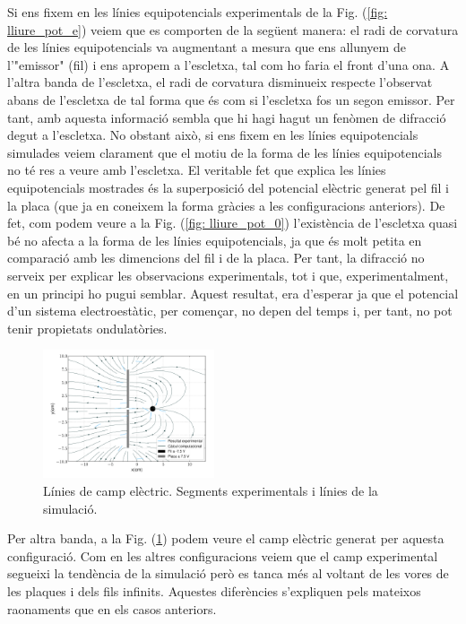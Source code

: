 \documentclass[11pt]{article}
\numberwithin{equation}{section}
\numberwithin{figure}{section}
\numberwithin{table}{section}
\begin{document}
Si ens fixem en les línies equipotencials experimentals de la Fig. (\ref{fig: lliure_pot_e}) veiem que es comporten de la següent manera: el radi de corvatura de les línies equipotencials va augmentant a mesura que ens allunyem de l'"emissor" (fil) i ens apropem a l'escletxa, tal com ho faria el front d'una ona. A l'altra banda de l'escletxa, el radi de corvatura disminueix respecte l'observat abans de l'escletxa de tal forma que és com si l'escletxa fos un segon emissor. Per tant, amb aquesta informació sembla que hi hagi hagut un fenòmen de difracció degut a l'escletxa.
No obstant això, si ens fixem en les línies equipotencials simulades veiem clarament que el motiu de la forma de les línies equipotencials no té res a veure amb l'escletxa. El veritable fet que explica les línies equipotencials mostrades és la superposició del potencial elèctric generat pel fil i la placa (que ja en coneixem la forma gràcies a les configuracions anteriors). De fet, com podem veure a la Fig. (\ref{fig: lliure_pot_0}) l'existència de l'escletxa quasi bé no afecta a la forma de les línies equipotencials, ja que és molt petita en comparació amb les dimencions del fil i de la placa. Per tant, la difracció no serveix per explicar les observacions experimentals, tot i que, experimentalment, en un principi ho pugui semblar. Aquest resultat, era d'esperar ja que el potencial d'un sistema electroestàtic, per començar, no depen del temps i, per tant, no pot tenir propietats ondulatòries.
\begin{figure}
    \centering
    \includegraphics[width=0.45\textwidth]{lliure_camp.pdf}
    \caption{Línies de camp elèctric. Segments experimentals i línies de la simulació.}
    \label{fig: lliure_camp}
\end{figure}

Per altra banda, a la Fig. (\ref{fig: lliure_camp}) podem veure el camp elèctric generat per aquesta configuració. Com en les altres configuracions veiem que el camp experimental segueixi la tendència de la simulació però es tanca més al voltant de les vores de les plaques i dels fils infinits. Aquestes diferències s'expliquen pels mateixos raonaments que en els casos anteriors.
\end{document}
